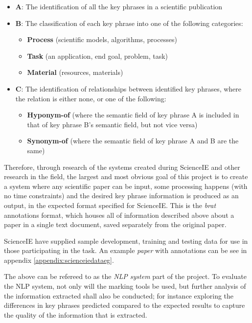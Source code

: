 \begin{itemize}
	\item \textbf{A}: The identification of all the key phrases in a scientific publication
	\item \textbf{B}: The classification of each key phrase into one of the following categories:
	\begin{itemize}
		\item \textbf{Process} (scientific models, algorithms, processes)
		\item \textbf{Task} (an application, end goal, problem, task)
		\item \textbf{Material} (resources, materials)
	\end{itemize}
	\item \textbf{C}: The identification of relationships between identified key phrases, where the relation is either none, or one of the following:
	\begin{itemize}
		\item \textbf{Hyponym-of} (where the semantic field of key phrase A is included in that of key phrase B's semantic field, but not vice versa)
		\item \textbf{Synonym-of} (where the semantic field of key phrase A and B are the same)
	\end{itemize}
\end{itemize}

Therefore, through research of the systems created during ScienceIE and other research in the field, the largest and most obvious goal of this project is to create a system where any scientific paper can be input, some processing happens (with no time constraints) and the desired key phrase information is produced as an output, in the expected format specified for ScienceIE. This is the \textit{brat} annotations format, which houses all of information described above about a paper in a single text document, saved separately from the original paper. 

ScienceIE have supplied sample development, training and testing data for use in those participating in the task. An example \textit{paper} with annotations can be see in appendix \ref{appendix:scienceiedataeg}.

The above can be refereed to as the \textit{NLP system} part of the project. To evaluate the NLP system, not only will the marking tools be used, but further analysis of the information extracted shall also be conducted; for instance exploring the differences in key phrases predicted compared to the expected results to capture the quality of the information that is extracted.

